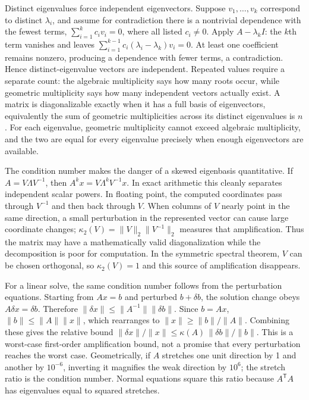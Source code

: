 Distinct eigenvalues force independent eigenvectors. Suppose \(v_1,\ldots,v_k\) correspond to distinct \(\lambda_i\), and assume for contradiction there is a nontrivial dependence with the fewest terms, \(\sum_{i=1}^k c_iv_i=0\), where all listed \(c_i\ne0\). Apply \(A-\lambda_kI\): the \(k\)th term vanishes and leaves \(\sum_{i=1}^{k-1}c_i(\lambda_i-\lambda_k)v_i=0\). At least one coefficient remains nonzero, producing a dependence with fewer terms, a contradiction. Hence distinct-eigenvalue vectors are independent. Repeated values require a separate count: the algebraic multiplicity says how many roots occur, while geometric multiplicity says how many independent vectors actually exist. A matrix is diagonalizable exactly when it has a full basis of eigenvectors, equivalently the sum of geometric multiplicities across its distinct eigenvalues is \(n\). For each eigenvalue, geometric multiplicity cannot exceed algebraic multiplicity, and the two are equal for every eigenvalue precisely when enough eigenvectors are available.

The condition number makes the danger of a skewed eigenbasis quantitative. If \(A=V\Lambda V^{-1}\), then \(A^kx=V\Lambda^kV^{-1}x\). In exact arithmetic this cleanly separates independent scalar powers. In floating point, the computed coordinates pass through \(V^{-1}\) and then back through \(V\). When columns of \(V\) nearly point in the same direction, a small perturbation in the represented vector can cause large coordinate changes; \(\kappa_2(V)=\|V\|_2\|V^{-1}\|_2\) measures that amplification. Thus the matrix may have a mathematically valid diagonalization while the decomposition is poor for computation. In the symmetric spectral theorem, \(V\) can be chosen orthogonal, so \(\kappa_2(V)=1\) and this source of amplification disappears.

For a linear solve, the same condition number follows from the perturbation equations. Starting from \(Ax=b\) and perturbed \(b+\delta b\), the solution change obeys \(A\delta x=\delta b\). Therefore \(\|\delta x\|\le\|A^{-1}\|\|\delta b\|\). Since \(b=Ax\), \(\|b\|\le\|A\|\|x\|\), which rearranges to \(\|x\|\ge\|b\|/\|A\|\). Combining these gives the relative bound \(\|\delta x\|/\|x\|\le\kappa(A)\,\|\delta b\|/\|b\|\). This is a worst-case first-order amplification bound, not a promise that every perturbation reaches the worst case. Geometrically, if \(A\) stretches one unit direction by 1 and another by \(10^{-6}\), inverting it magnifies the weak direction by \(10^6\); the stretch ratio is the condition number. Normal equations square this ratio because \(A^\mathsf TA\) has eigenvalues equal to squared stretches.

